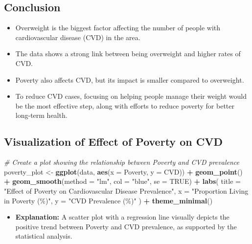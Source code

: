 \documentclass[
]{article}
\newenvironment{Shaded}{\begin{snugshade}}{\end{snugshade}}
\newcommand{\AttributeTok}[1]{\textcolor[rgb]{0.13,0.29,0.53}{#1}}
\newcommand{\CommentTok}[1]{\textcolor[rgb]{0.56,0.35,0.01}{\textit{#1}}}
\newcommand{\ConstantTok}[1]{\textcolor[rgb]{0.56,0.35,0.01}{#1}}
\newcommand{\FunctionTok}[1]{\textcolor[rgb]{0.13,0.29,0.53}{\textbf{#1}}}
\newcommand{\NormalTok}[1]{#1}
\newcommand{\OtherTok}[1]{\textcolor[rgb]{0.56,0.35,0.01}{#1}}
\newcommand{\SpecialCharTok}[1]{\textcolor[rgb]{0.81,0.36,0.00}{\textbf{#1}}}
\newcommand{\StringTok}[1]{\textcolor[rgb]{0.31,0.60,0.02}{#1}}
\providecommand{\tightlist}{%
  \setlength{\itemsep}{0pt}\setlength{\parskip}{0pt}}
\begin{document}
\subsection{Conclusion}\label{conclusion}

\begin{itemize}
\tightlist
\item
  Overweight is the biggest factor affecting the number of people with
  cardiovascular disease (CVD) in the area.
\item
  The data shows a strong link between being overweight and higher rates
  of CVD.
\item
  Poverty also affects CVD, but its impact is smaller compared to
  overweight.
\item
  To reduce CVD cases, focusing on helping people manage their weight
  would be the most effective step, along with efforts to reduce poverty
  for better long-term health.
\end{itemize}

\subsection{Visualization of Effect of Poverty on
CVD}\label{visualization-of-effect-of-poverty-on-cvd}

\begin{Shaded}
\begin{Highlighting}[]
\CommentTok{\# Create a plot showing the relationship between Poverty and CVD prevalence}
\NormalTok{poverty\_plot }\OtherTok{\textless{}{-}} \FunctionTok{ggplot}\NormalTok{(data, }\FunctionTok{aes}\NormalTok{(}\AttributeTok{x =}\NormalTok{ Poverty, }\AttributeTok{y =}\NormalTok{ CVD)) }\SpecialCharTok{+}
  \FunctionTok{geom\_point}\NormalTok{() }\SpecialCharTok{+}
  \FunctionTok{geom\_smooth}\NormalTok{(}\AttributeTok{method =} \StringTok{"lm"}\NormalTok{, }\AttributeTok{col =} \StringTok{"blue"}\NormalTok{, }\AttributeTok{se =} \ConstantTok{TRUE}\NormalTok{) }\SpecialCharTok{+}
  \FunctionTok{labs}\NormalTok{(}
    \AttributeTok{title =} \StringTok{"Effect of Poverty on Cardiovascular Disease Prevalence"}\NormalTok{,}
    \AttributeTok{x =} \StringTok{"Proportion Living in Poverty (\%)"}\NormalTok{,}
    \AttributeTok{y =} \StringTok{"CVD Prevalence (\%)"}
\NormalTok{  ) }\SpecialCharTok{+}
  \FunctionTok{theme\_minimal}\NormalTok{()}
\end{Highlighting}
\end{Shaded}

\begin{itemize}
\tightlist
\item
  \textbf{Explanation:} A scatter plot with a regression line visually
  depicts the positive trend between Poverty and CVD prevalence, as
  supported by the statistical analysis.
\end{itemize}
\end{document}
